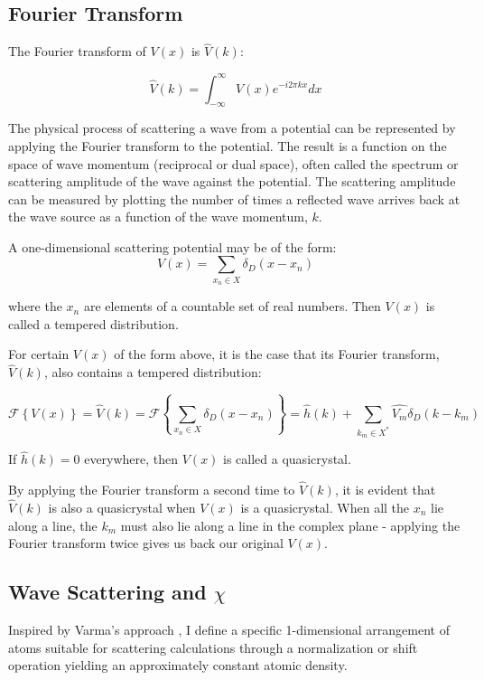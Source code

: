 \documentclass[11pt, oneside]{article}
\begin{document}
\subsection{Fourier Transform}
The Fourier transform of $V(x)$ is $\hat{V}(k)$:

\begin{equation}
\hat{V}(k) = \int_{-\infty}^{\infty}V(x)e^{-i2\pi kx}dx
\end{equation}

The physical process of scattering a wave from a potential can be represented by applying the Fourier transform to the potential. The result is a function on the space of wave momentum (reciprocal or dual space), often called the spectrum or scattering amplitude of the wave against the potential. The scattering amplitude can be measured by plotting the number of times a reflected wave arrives back at the wave source as a function of the wave momentum, $k$.

A one-dimensional scattering potential may be of the form:
\begin{equation}
V(x) = \sum_{x_n \in X}\delta_D(x - x_n)
\end{equation} 
 
where the $x_n$ are elements of a countable set of real numbers. Then $V(x)$ is called a tempered distribution.

For certain $V(x)$ of the form above, it is the case that its Fourier transform, $\hat{V}(k)$, also contains a tempered distribution:
  
\begin{equation}
 \label{eq: RiemannFourier}
 \mathcal{F}\left \{V(x)\right \} = \hat{V}(k) = \mathcal{F}\left \{ \sum_{x_n \in X}\delta_D(x - x_n) \right \} = \hat{h}(k) +  \sum_{k_m \in X^{*}} \hat{V_{m}} \delta_D(k - k_{m})
\end{equation}

If $\hat{h}(k) = 0$ everywhere, then $V(x)$ is called a quasicrystal.

By applying the Fourier transform a second time to $\hat{V}(k)$, it is evident that $\hat{V}(k)$ is also a quasicrystal when $V(x)$ is a quasicrystal. When all the $x_n$ lie along a line, the $k_m$ must also lie along a line in the complex plane - applying the Fourier transform twice gives us back our original $V(x)$.

\subsection{Wave Scattering and $\chi$}
Inspired by Varma's approach \cite{Varma2016}, I define a specific 1-dimensional arrangement of atoms suitable for scattering calculations through a normalization or shift operation yielding an approximately constant atomic density.
\end{document}
